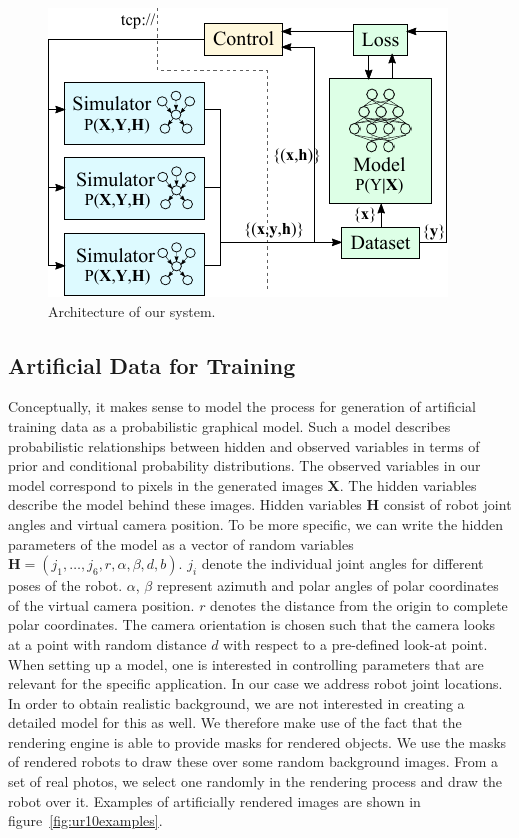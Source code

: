 \documentclass[conference]{IEEEtran}
\begin{document}
    \begin{figure}[htbp]
        \centerline{\includegraphics[width=0.9\columnwidth]{figures/architecture/overview.pdf}}
        \caption{\label{fig:architecture} Architecture of our system.}
    \end{figure}


\subsection{Artificial Data for Training}

    Conceptually, it makes sense to model the process for generation of artificial training data as a probabilistic graphical model. Such a model describes probabilistic relationships between hidden and observed variables in terms of prior and conditional probability distributions. The observed variables in our model correspond to pixels in the generated images $\mathbf{X}$. The hidden variables describe the model behind these images. Hidden variables $\mathbf{H}$ consist of robot joint angles and virtual camera position. To be more specific, we can write the hidden parameters of the model as a vector of random variables $\mathbf{H} = (j_1, \dots, j_6, r, \alpha, \beta, d, b)$. $j_i$ denote the individual joint angles for different poses of the robot. $\alpha$, $\beta$  represent azimuth and polar angles of polar coordinates of the virtual camera position. $r$ denotes the distance from the origin to complete polar coordinates. The camera orientation is chosen such that the camera looks at a point with random distance $d$ with respect to a pre-defined look-at point. When setting up a model, one is interested in controlling parameters that are relevant for the specific application. In our case we address robot joint locations. In order to obtain realistic background, we are not interested in creating a detailed model for this as well. We therefore make use of the fact that the rendering engine is able to provide masks for rendered objects. We use the masks of rendered robots to draw these over some random background images. From a set of real photos, we select one randomly in the rendering process and draw the robot over it. Examples of artificially rendered images are shown in figure~\ref{fig:ur10examples}.
    
\end{document}
